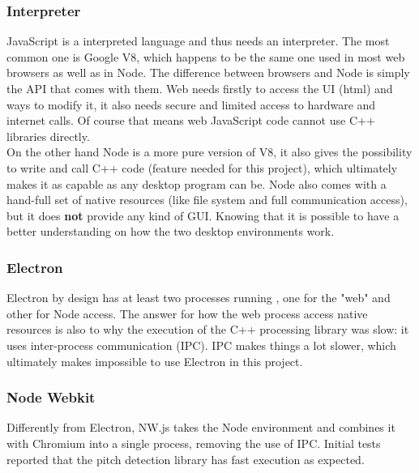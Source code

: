\subsubsection{Interpreter}
JavaScript is a interpreted language and thus needs an interpreter. The most
common one is Google V8, which happens to be the same one used in most web
browsers as well as in Node. The difference between browsers and Node is simply
the API that comes with them. Web needs firstly to access the UI (html) and ways to
modify it, it also needs secure and limited access to hardware and internet calls.
Of course that means web JavaScript code cannot use C++ libraries directly. \\
On the other hand Node is a more pure version of V8, it also gives the possibility
to write and call C++ code (feature needed for this project), which ultimately
makes it as capable as any desktop
program can be. Node also comes with a hand-full set of native resources (like
file system and full communication access), but it does \textbf{not} provide
any kind of GUI. Knowing that it is possible to have a better understanding on
how the two desktop environments work.

\subsubsection{Electron}
Electron by design has at least two processes running \cite{ElectronVsNW},
one for the "web" and other
for Node access. The answer for how the web process access native resources is
also to why the execution of the C++ processing library was slow: it uses
inter-process communication (IPC). IPC makes things a lot slower, which ultimately
makes impossible to use Electron in this project.

\subsubsection{Node Webkit}
Differently from Electron, NW.js \cite{NWjs, ElectronVsNW} takes the Node environment
and combines it with Chromium into a single process, removing the use of IPC.
Initial tests reported that the pitch detection library has fast
execution as expected.

